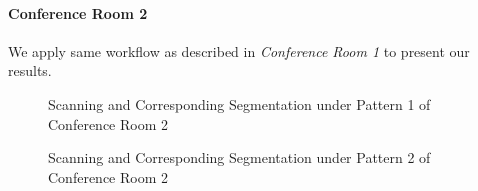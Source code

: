 \documentclass[11pt, a4paper,oneside,chapterprefix=false]{scrbook}
\begin{document}
\vspace{30pt}

\paragraph{Conference Room 2}

We apply same workflow as described in \emph{Conference Room 1} to present our results.

\begin{figure}[H]
    \centering
      \label{fig:conf2 0 occluded} \hfill
     \label{fig:conf2 0 seg}
    \caption{Scanning and Corresponding Segmentation under Pattern 1 of Conference Room 2}
    \label{fig:conf2 0 occ and seg}
\end{figure}

\begin{figure}[H]
    \centering
      \label{fig:conf2 1 occluded} \hfill
     \label{fig:conf2 1 seg}
    \caption{Scanning and Corresponding Segmentation under Pattern 2 of Conference Room 2}
    \label{fig:conf2 1 occ and seg}
\end{figure}
\end{document}
